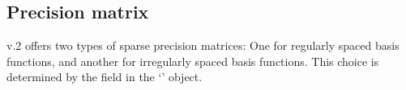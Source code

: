 \documentclass[nojss]{jss}
\newcommand{\class}[1]{`\code{#1}'}
\def\mbf#1{{%
\mathchoice%
{\hbox{\boldmath$\displaystyle{#1}$}}%
{\hbox{\boldmath$\textstyle{#1}$}}%
{\hbox{\boldmath$\scriptstyle{#1}$}}%
{\hbox{\boldmath$\scriptscriptstyle{#1}$}}%
}}
\def\vec{\mbf}
\begin{document}
\begin{appendix}


\subsection{Precision matrix}

 v.2 offers two types of sparse precision matrices: One for regularly spaced basis functions, and another for irregularly spaced basis functions. 
 This choice is determined by the field  in the \class{Basis} object.


\end{appendix}
\end{document}
